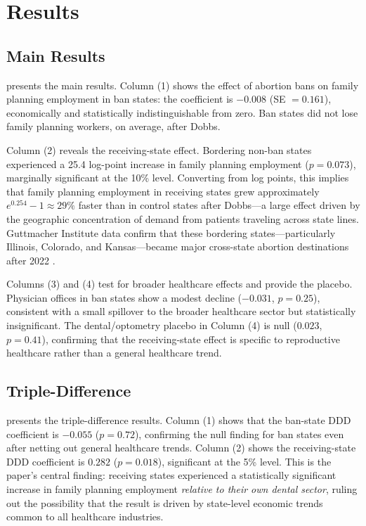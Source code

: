 \documentclass[12pt]{article}
\begin{document}
\section{Results}
\label{sec:results}

\subsection{Main Results}



 presents the main results. Column (1) shows the effect of abortion bans on family planning employment in ban states: the coefficient is $-0.008$ (SE $= 0.161$), economically and statistically indistinguishable from zero. Ban states did not lose family planning workers, on average, after Dobbs.

Column (2) reveals the receiving-state effect. Bordering non-ban states experienced a 25.4 log-point increase in family planning employment ($p = 0.073$), marginally significant at the 10\% level. Converting from log points, this implies that family planning employment in receiving states grew approximately $e^{0.254} - 1 \approx 29\%$ faster than in control states after Dobbs---a large effect driven by the geographic concentration of demand from patients traveling across state lines. Guttmacher Institute data confirm that these bordering states---particularly Illinois, Colorado, and Kansas---became major cross-state abortion destinations after 2022 \citep{guttmacher2023}.

Columns (3) and (4) test for broader healthcare effects and provide the placebo. Physician offices in ban states show a modest decline ($-0.031$, $p = 0.25$), consistent with a small spillover to the broader healthcare sector but statistically insignificant. The dental/optometry placebo in Column (4) is null ($0.023$, $p = 0.41$), confirming that the receiving-state effect is specific to reproductive healthcare rather than a general healthcare trend.

\subsection{Triple-Difference}



 presents the triple-difference results. Column (1) shows that the ban-state DDD coefficient is $-0.055$ ($p = 0.72$), confirming the null finding for ban states even after netting out general healthcare trends. Column (2) shows the receiving-state DDD coefficient is $0.282$ ($p = 0.018$), significant at the 5\% level. This is the paper's central finding: receiving states experienced a statistically significant increase in family planning employment \textit{relative to their own dental sector}, ruling out the possibility that the result is driven by state-level economic trends common to all healthcare industries.
\end{document}

